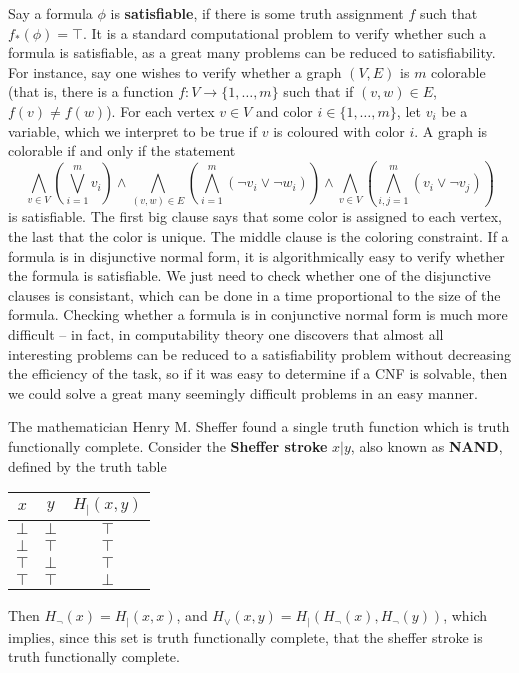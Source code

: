 Say a formula $\phi$ is {\bf satisfiable}, if there is some truth assignment $f$ such that $f_*(\phi) = \top$. It is a standard computational problem to verify whether such a formula is satisfiable, as a great many problems can be reduced to satisfiability. For instance, say one wishes to verify whether a graph $(V,E)$ is $m$ colorable (that is, there is a function $f: V \to \{ 1, \dots, m \}$ such that if $(v,w) \in E$, $f(v) \neq f(w)$). For each vertex $v \in V$ and color $i \in \{ 1, \dots, m \}$, let $v_i$ be a variable, which we interpret to be true if $v$ is coloured with color $i$. A graph is colorable if and only if the statement
%
\[ \bigwedge_{v \in V} \left( \bigvee_{i = 1}^m v_i \right) \wedge \bigwedge_{(v,w) \in E} \left( \bigwedge_{i = 1}^m (\neg v_i \vee \neg w_i) \right) \wedge \bigwedge_{v \in V} \left( \bigwedge_{i,j = 1}^m (v_i \vee \neg v_j) \right) \]
%
is satisfiable. The first big clause says that some color is assigned to each vertex, the last that the color is unique. The middle clause is the coloring constraint. If a formula is in disjunctive normal form, it is algorithmically easy to verify whether the formula is satisfiable. We just need to check whether one of the disjunctive clauses is consistant, which can be done in a time proportional to the size of the formula. Checking whether a formula is in conjunctive normal form is much more difficult -- in fact, in computability theory one discovers that almost all interesting problems can be reduced to a satisfiability problem without decreasing the efficiency of the task, so if it was easy to determine if a CNF is solvable, then we could solve a great many seemingly difficult problems in an easy manner.

\begin{example}
    The mathematician Henry M. Sheffer found a single truth function which is truth functionally complete. Consider the {\bf Sheffer stroke} $x|y$, also known as {\bf NAND}, defined by the truth table
    \begin{center}
    \begin{tabular}{| c | c | c |}
        \hline $x$ & $y$ & $H_|(x,y)$\\
        \hline $\bot$ & $\bot$ & $\top$\\
        $\bot$ & $\top$ & $\top$\\
        $\top$ & $\bot$ & $\top$\\
        $\top$ & $\top$ & $\bot$\\
        \hline
    \end{tabular}
    \end{center}
    Then $H_\neg(x) = H_|(x,x)$, and $H_\vee(x,y) = H_|(H_\neg(x), H_\neg(y))$, which implies, since this set is truth functionally complete, that the sheffer stroke is truth functionally complete.
\end{example}

